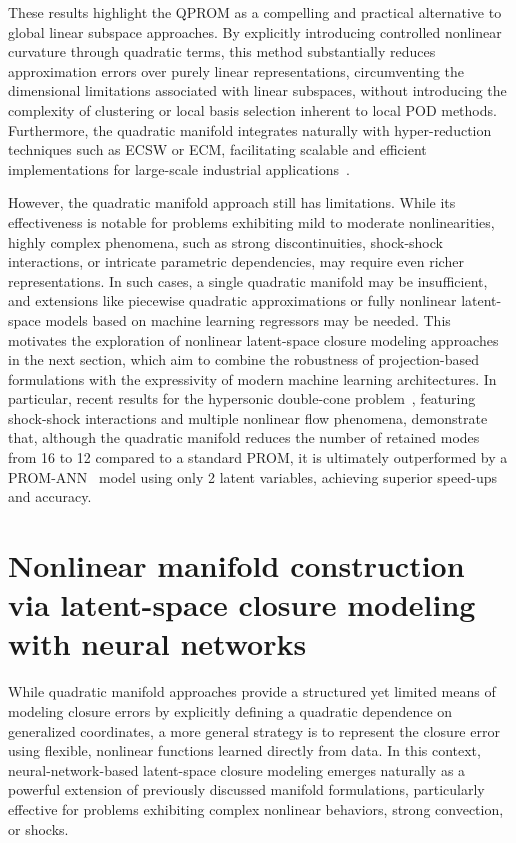 These results highlight the QPROM as a compelling and practical alternative to global linear subspace approaches. By explicitly introducing controlled nonlinear curvature through quadratic terms, this method substantially reduces approximation errors over purely linear representations, circumventing the dimensional limitations associated with linear subspaces, without introducing the complexity of clustering or local basis selection inherent to local POD methods. Furthermore, the quadratic manifold integrates naturally with hyper-reduction techniques such as ECSW or ECM, facilitating scalable and efficient implementations for large-scale industrial applications~\cite{barnett2022quadratic,chmiel2025unified}.

However, the quadratic manifold approach still has limitations. While its effectiveness is notable for problems exhibiting mild to moderate nonlinearities, highly complex phenomena, such as strong discontinuities, shock-shock interactions, or intricate parametric dependencies, may require even richer representations. In such cases, a single quadratic manifold may be insufficient, and extensions like piecewise quadratic approximations or fully nonlinear latent-space models based on machine learning regressors may be needed. This motivates the exploration of nonlinear latent-space closure modeling approaches in the next section, which aim to combine the robustness of projection-based formulations with the expressivity of modern machine learning architectures. In particular, recent results for the hypersonic double-cone problem~\cite{chmiel2025unified}, featuring shock-shock interactions and multiple nonlinear flow phenomena, demonstrate that, although the quadratic manifold reduces the number of retained modes from 16 to 12 compared to a standard PROM, it is ultimately outperformed by a PROM-ANN~\cite{barnett2023neural, chmiel2025unified} model using only 2 latent variables, achieving superior speed-ups and accuracy.


\section{Nonlinear manifold construction via latent-space closure modeling with neural networks}
\label{sec:latent_nn}

While quadratic manifold approaches provide a structured yet limited means of modeling closure errors by explicitly defining a quadratic dependence on generalized coordinates, a more general strategy is to represent the closure error using flexible, nonlinear functions learned directly from data. In this context, neural-network-based latent-space closure modeling emerges naturally as a powerful extension of previously discussed manifold formulations, particularly effective for problems exhibiting complex nonlinear behaviors, strong convection, or shocks.

